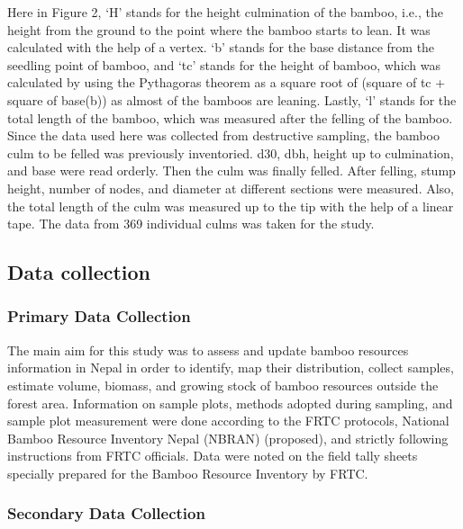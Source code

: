 \documentclass[preprint, 3p,
authoryear]{elsarticle} %
\begin{document}
Here in Figure 2, `H' stands for the height culmination of the bamboo,
i.e., the height from the ground to the point where the bamboo starts to
lean. It was calculated with the help of a vertex. `b' stands for the
base distance from the seedling point of bamboo, and `tc' stands for the
height of bamboo, which was calculated by using the Pythagoras theorem
as a square root of (square of tc + square of base(b)) as almost of the
bamboos are leaning. Lastly, `l' stands for the total length of the
bamboo, which was measured after the felling of the bamboo. Since the
data used here was collected from destructive sampling, the bamboo culm
to be felled was previously inventoried. d30, dbh, height up to
culmination, and base were read orderly. Then the culm was finally
felled. After felling, stump height, number of nodes, and diameter at
different sections were measured. Also, the total length of the culm was
measured up to the tip with the help of a linear tape. The data from 369
individual culms was taken for the study.

\hypertarget{data-collection}{%
\subsection{Data collection}\label{data-collection}}

\hypertarget{primary-data-collection}{%
\subsubsection{Primary Data Collection}\label{primary-data-collection}}

The main aim for this study was to assess and update bamboo resources
information in Nepal in order to identify, map their distribution,
collect samples, estimate volume, biomass, and growing stock of bamboo
resources outside the forest area. Information on sample plots, methods
adopted during sampling, and sample plot measurement were done according
to the FRTC protocols, National Bamboo Resource Inventory Nepal (NBRAN)
(proposed), and strictly following instructions from FRTC officials.
Data were noted on the field tally sheets specially prepared for the
Bamboo Resource Inventory by FRTC.

\hypertarget{secondary-data-collection}{%
\subsubsection{Secondary Data
Collection}\label{secondary-data-collection}}
\end{document}

